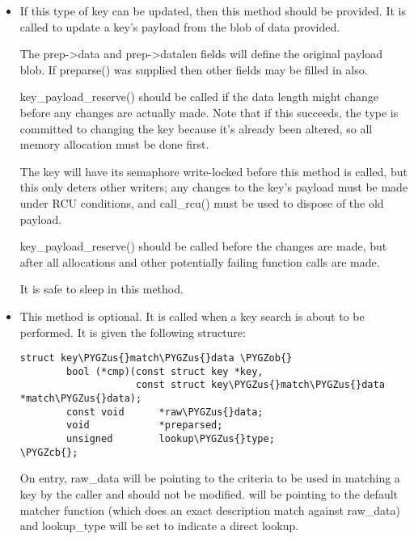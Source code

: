 \documentclass[a4paper,8pt,english]{sphinxmanual}
\def\PYGZus{\char`\_}
\def\PYGZob{\char`\{}
\def\PYGZcb{\char`\}}
\begin{document}
\begin{itemize}
\item {} 

If this type of key can be updated, then this method should be provided.
It is called to update a key's payload from the blob of data provided.

The prep-\textgreater{}data and prep-\textgreater{}datalen fields will define the original payload
blob.  If preparse() was supplied then other fields may be filled in also.

key\_payload\_reserve() should be called if the data length might change
before any changes are actually made. Note that if this succeeds, the type
is committed to changing the key because it's already been altered, so all
memory allocation must be done first.

The key will have its semaphore write-locked before this method is called,
but this only deters other writers; any changes to the key's payload must
be made under RCU conditions, and call\_rcu() must be used to dispose of
the old payload.

key\_payload\_reserve() should be called before the changes are made, but
after all allocations and other potentially failing function calls are
made.

It is safe to sleep in this method.

\item {} 

This method is optional.  It is called when a key search is about to be
performed.  It is given the following structure:

\begin{Verbatim}[commandchars=\\\{\}]
struct key\PYGZus{}match\PYGZus{}data \PYGZob{}
        bool (*cmp)(const struct key *key,
                    const struct key\PYGZus{}match\PYGZus{}data *match\PYGZus{}data);
        const void      *raw\PYGZus{}data;
        void            *preparsed;
        unsigned        lookup\PYGZus{}type;
\PYGZcb{};
\end{Verbatim}

On entry, raw\_data will be pointing to the criteria to be used in matching
a key by the caller and should not be modified.   will be pointing
to the default matcher function (which does an exact description match
against raw\_data) and lookup\_type will be set to indicate a direct lookup.


\end{itemize}
\end{document}
